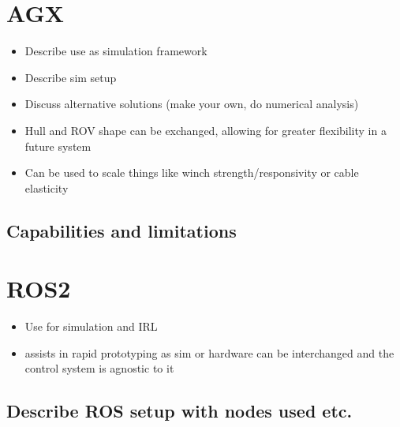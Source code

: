 
\section{AGX}
\begin{itemize}
\item Describe use as simulation framework
\item Describe sim setup
\item Discuss alternative solutions (make your own, do numerical analysis)
\item Hull and ROV shape can be exchanged, allowing for greater flexibility in a future system
\item Can be used to scale things like winch strength/responsivity or cable elasticity
\end{itemize}
\subsection{Capabilities and limitations}

\section{ROS2}
\begin{itemize}
\item Use for simulation and IRL
\item assists in rapid prototyping as sim or hardware can be interchanged and the control system is agnostic to it
\end{itemize}
\subsection{Describe ROS setup with nodes used etc.}

